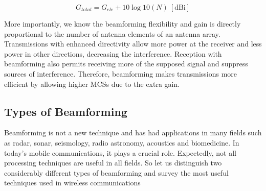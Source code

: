 \begin{equation} \label{eq:gain}
    G_{total} = G_{ele} + 10 \log10(N) \ [\text{dBi}]
\end{equation}

More importantly, we know the beamforming flexibility and gain is directly proportional to the number of antenna elements of an antenna array. Transmissions with enhanced directivity allow more power at the receiver and less power in other directions, decreasing the interference. Reception with beamforming also permits receiving more of the supposed signal and suppress sources of interference. Therefore, beamforming makes transmissions more efficient by allowing higher \acp{MCS} due to the extra gain.


\subsection*{Types of Beamforming} \label{sec:types_of_beamforming}

Beamforming is not a new technique \cite{6591907} and has had applications in many fields such as radar, sonar, seismology, radio astronomy, acoustics and biomedicine. In today's mobile communications, it plays a crucial role. Expectedly, not all processing techniques are useful in all fields. So let us distinguish two considerably different types of beamforming and survey the most useful techniques used in wireless communications

